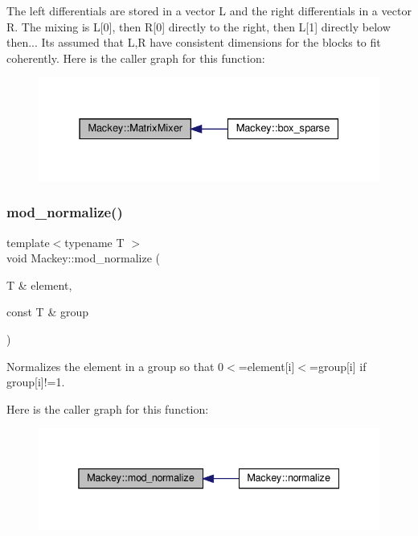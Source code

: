 The left differentials are stored in a vector L and the right differentials in a vector R. The mixing is L\mbox{[}0\mbox{]}, then R\mbox{[}0\mbox{]} directly to the right, then L\mbox{[}1\mbox{]} directly below then... It\textquotesingle{}s assumed that L,R have consistent dimensions for the blocks to fit coherently. Here is the caller graph for this function\+:\nopagebreak
\begin{figure}[H]
\begin{center}
\leavevmode
\includegraphics[width=331pt]{namespaceMackey_a1c34295db9666bc7e86b2972c345d291_icgraph}
\end{center}
\end{figure}
\mbox{\label{namespaceMackey_a257bcf5aabab2d73fdb13a23cb975d93}} 
\subsubsection{\texorpdfstring{mod\+\_\+normalize()}{mod\_normalize()}}
{\footnotesize\ttfamily template$<$typename T $>$ \\
void Mackey\+::mod\+\_\+normalize (\begin{DoxyParamCaption}\item[{T \&}]{element,  }\item[{const T \&}]{group }\end{DoxyParamCaption})}



Normalizes the element in a group so that 0$<$=element\mbox{[}i\mbox{]}$<$=group\mbox{[}i\mbox{]} if group\mbox{[}i\mbox{]}!=1. 

Here is the caller graph for this function\+:\nopagebreak
\begin{figure}[H]
\begin{center}
\leavevmode
\includegraphics[width=338pt]{namespaceMackey_a257bcf5aabab2d73fdb13a23cb975d93_icgraph}
\end{center}
\end{figure}
\mbox{\label{namespaceMackey_a80dbde3a859378ede596b48869ec50d9}} 

